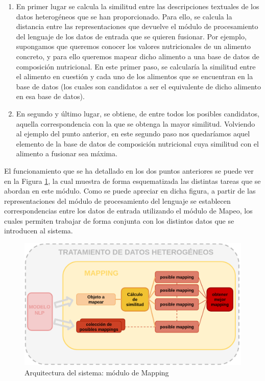 \begin{enumerate}
    \item En primer lugar se calcula la similitud entre las descripciones textuales de los datos heterogéneos que se han proporcionado. Para ello, se calcula la distancia entre las representaciones que devuelve el módulo de procesamiento del lenguaje de los datos de entrada que se quieren fusionar. Por ejemplo, supongamos que queremos conocer los valores nutricionales de un alimento concreto, y para ello queremos mapear dicho alimento a una base de datos de composición nutricional. En este primer paso, se calcularía la similitud entre el alimento en cuestión y cada uno de los alimentos que se encuentran en la base de datos (los cuales son candidatos a ser el equivalente de dicho alimento en esa base de datos).
    
    \item En segundo y último lugar, se obtiene, de entre todos los posibles candidatos, aquella correspondencia con la que se obtenga la mayor similitud. Volviendo al ejemplo del punto anterior, en este segundo paso nos quedaríamos aquel elemento de la base de datos de composición nutricional cuya similitud con el alimento a fusionar sea máxima.

\end{enumerate}

El funcionamiento que se ha detallado en los dos puntos anteriores se puede ver en la Figura \ref{fig:arq_mapping}, la cual muestra de forma esquematizada las distintas tareas que se abordan en este módulo. Como se puede apreciar en dicha figura, a partir de las representaciones del módulo de procesamiento del lenguaje se establecen correspondencias entre los datos de entrada utilizando el módulo de Mapeo, los cuales permiten trabajar de forma conjunta con los distintos datos que se introducen al sistema.

\begin{figure}[H]
    \centering
    \includegraphics[width=1.0\textwidth]{imagenes/arquitectura/mapping.png}
    \caption{Arquitectura del sistema: módulo de Mapping}
    \label{fig:arq_mapping}
\end{figure}

